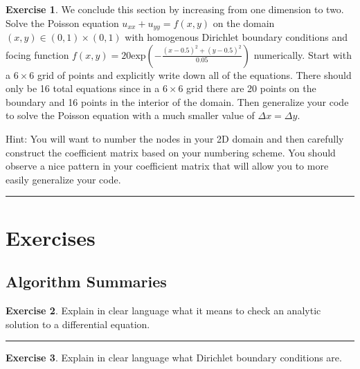 \documentclass[
]{book}
\theoremstyle{definition}
\theoremstyle{definition}
\theoremstyle{definition}
\newtheorem{exercise}{Exercise}[chapter]
\theoremstyle{remark}
\begin{document}
\begin{exercise}
\protect\hypertarget{exr:unnamed-chunk-603}{}{\label{exr:unnamed-chunk-603} }We conclude this section by increasing from one dimension to two. Solve the Poisson equation \(u_{xx} + u_{yy} = f(x,y)\) on the domain \((x,y) \in (0,1)\times (0,1)\) with homogenous Dirichlet boundary conditions and focing function \(f(x,y) = 20\text{exp}\left( -\frac{(x-0.5)^2 + (y-0.5)^2}{0.05} \right)\) numerically. Start with a \(6 \times 6\) grid of points and explicitly write down all of the equations. There should only be 16 total equations since in a \(6 \times 6\) grid there are 20 points on the boundary and 16 points in the interior of the domain. Then generalize your code to solve the Poisson equation with a much smaller value of \(\Delta x = \Delta y\).

Hint: You will want to number the nodes in your 2D domain and then carefully construct the coefficient matrix based on your numbering scheme. You should observe a nice pattern in your coefficient matrix that will allow you to more easily generalize your code.
\end{exercise}

\begin{center}\rule{0.5\linewidth}{0.5pt}\end{center}

\hypertarget{exercises-5}{%
\section{Exercises}\label{exercises-5}}

\hypertarget{algorithm-summaries-4}{%
\subsection{Algorithm Summaries}\label{algorithm-summaries-4}}

\begin{exercise}
\protect\hypertarget{exr:unnamed-chunk-604}{}{\label{exr:unnamed-chunk-604} }Explain in clear language what it means to check an analytic solution to
a differential equation.
\end{exercise}

\begin{center}\rule{0.5\linewidth}{0.5pt}\end{center}

\begin{exercise}
\protect\hypertarget{exr:unnamed-chunk-605}{}{\label{exr:unnamed-chunk-605} }Explain in clear language what Dirichlet boundary conditions are.
\end{exercise}
\end{document}

